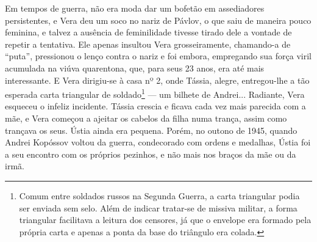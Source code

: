 Em tempos de guerra, não era moda dar um bofetão em assediadores
persistentes, e Vera deu um soco no nariz de Pávlov, o que saiu de
maneira pouco feminina, e talvez a ausência de feminilidade tivesse
tirado dele a vontade de repetir a tentativa. Ele apenas insultou Vera
grosseiramente, chamando-a de ``puta'', pressionou o lenço contra o
nariz e foi embora, empregando sua força viril acumulada na viúva
quarentona, que, para seus 23 anos, era até mais interessante. E Vera
dirigiu-se à casa nº 2, onde Tássia, alegre, entregou-lhe a tão esperada
carta triangular de soldado\footnote{Comum entre soldados russos na
  Segunda Guerra, a carta triangular podia ser enviada sem selo. Além de
  indicar tratar-se de missiva militar, a forma triangular facilitava a
  leitura dos censores, já que o envelope era formado pela própria carta
  e apenas a ponta da base do triângulo era colada.} --- um bilhete de
Andrei... Radiante, Vera esqueceu o infeliz incidente. Tássia crescia e
ficava cada vez mais parecida com a mãe, e Vera começou a ajeitar os
cabelos da filha numa trança, assim como trançava os seus. Ústia ainda
era pequena. Porém, no outono de 1945, quando Andrei Kopóssov voltou da
guerra, condecorado com ordens e medalhas, Ústia foi a seu encontro com
os próprios pezinhos, e não mais nos braços da mãe ou da irmã.

